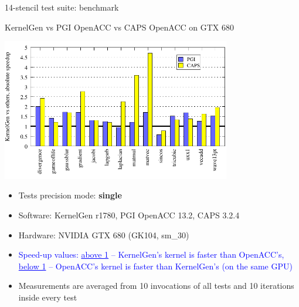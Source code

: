 \documentclass[aspectratio=169]{beamer}
\begin{document}
\begin{frame}[fragile]{14-stencil test suite: benchmark}

{KernelGen} {\color{red}vs} {PGI OpenACC} {\color{red}vs} {CAPS OpenACC} on GTX 680

\begin{minipage}{10cm}
\includegraphics[width=10cm]{figures/intercomp_gtx680_single}
\end{minipage}%
\begin{minipage}{5cm}
{\footnotesize
\begin{itemize}
\item Tests precision mode: {\bf single}
\item Software: KernelGen r1780, PGI {OpenACC} 13.2, CAPS 3.2.4
\item Hardware: NVIDIA GTX 680 (GK104, sm\_30)
\item \textcolor{blue}{Speed-up values: \underline{above 1} -- KernelGen's kernel is faster than OpenACC's, \underline{below 1} -- OpenACC's kernel is faster than KernelGen's (on the same GPU)}
\item Measurements are averaged from 10 invocations of all tests and 10 iterations inside every test
\end{itemize}}
\end{minipage}

\end{frame}
\end{document}
